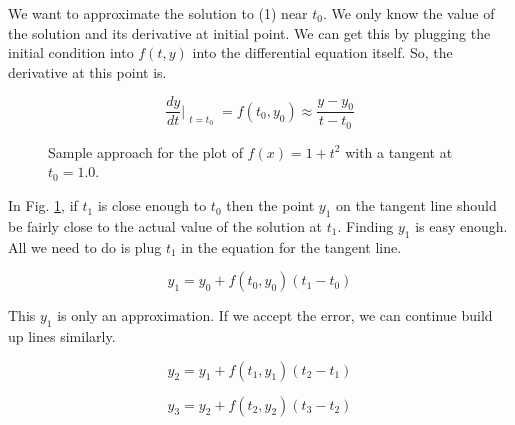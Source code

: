 \documentclass[a4paper]{article}
\begin{document}
We want to approximate the solution to (1) near $ t_0 $. We only know the value of the solution and its derivative at initial point. We can get this by plugging the initial condition into $ f(t, y) $ into the differential equation itself.  So, the derivative at this point is.

\begin{equation}
	\frac{dy}{dt}\Bigr|_{\substack{t=t_0}} = f(t_0, y_0) \approx \frac{y - y_0}{t - t_0}
\end{equation}

\begin{figure}[htbp]
    \begin{center}
    \end{center}
    \caption{Sample approach for the plot of $f(x)=1+t^2$ with a tangent at $t_0=1.0$.}\label{eulerplot}
\end{figure}

In Fig. \ref{eulerplot}, if $ t_1 $ is close enough to $ t_0 $ then the point $ y_1 $ on the tangent line should be fairly close to the actual value of the solution at  $ t_1 $. Finding $ y_1 $ is easy enough. All we need to do is plug $ t_1 $ in the equation for the tangent line.

\begin{equation}
	y_1 = y_0 + f(t_0, y_0)(t_1 - t_0)
\end{equation}

This $ y_1 $ is only an approximation. If we accept the error, we can continue build up lines similarly.

\begin{equation}
	y_2 = y_1 + f(t_1, y_1)(t_2 - t_1)
\end{equation}

\begin{equation}
	y_3 = y_2 + f(t_2, y_2)(t_3 - t_2)
\end{equation}
\end{document}
